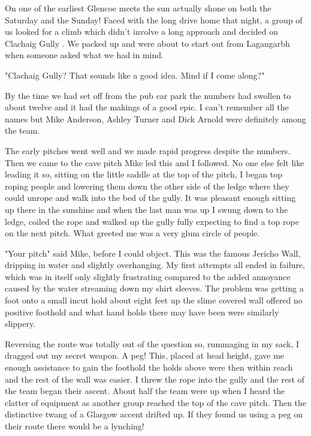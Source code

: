\documentclass[a5paper,openany,font 10pt]{scrbook}
\begin{document}
On one of the earliest Glencoe meets the sun actually shone
on both the Saturday and the Sunday! Faced with the long drive
home that night, a group of us looked for a climb which didn't
involve a long approach and decided on    Clachaig Gully   . We packed
up and were about to start out from Lagangarbh when someone asked
what we had in mind.

"Clachaig Gully? That sounds like a good idea. Mind if I
come along?"

By the time we had set off from the pub car park the numbers
had swollen to about twelve and it had the makings of a good
epic. I can't remember all the names but Mike Anderson, Ashley
Turner and Dick Arnold were definitely among the team.

The early pitches went well and we made rapid progress
despite the numbers. Then we came to the cave pitch  Mike led
this and I followed. No one else felt like leading it so, sitting
on the little saddle at the top of the pitch, I began top roping
people and lowering them down the other side of the ledge where
they could unrope and walk into the bed of the gully. It was
pleasant enough sitting up there in the sunshine and when the
last man was up I swung down to the ledge, coiled the rope and
walked up the gully fully expecting to find a top rope on the
next pitch. What greeted me was a very glum circle of people.

"Your pitch" said Mike, before I could object. This was the
famous Jericho Wall, dripping in water and slightly overhanging.
My first attempts all ended in failure, which was in itself only
slightly frustrating compared to the added annoyance caused by
the water streaming down my shirt sleeves. The problem was
getting a foot onto a small incut hold about eight feet up  the
slime covered wall offered no positive foothold and what hand
holds there may have been were similarly slippery.

Reversing the route was totally out of the question so, rummaging in
my sack, I dragged out my secret weapon. A peg!  This, placed at head
height, gave me enough assistance to gain the foothold the holds above
were then within reach and the rest of the wall was easier. I threw
the rope into the gully and the rest of the team began their
ascent. About half the team were up when I heard the clatter of
equipment as another group reached the top of the cave pitch. Then the
distinctive twang of a Glasgow accent drifted up.  If they found us
using a peg on their route there would be a lynching!
\end{document}
